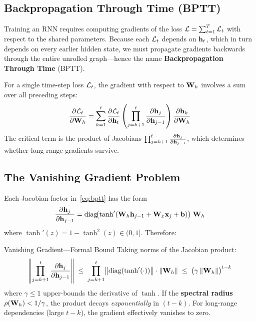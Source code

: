 \subsection{Backpropagation Through Time (BPTT)}

Training an RNN requires computing gradients of the loss
$\mathcal{L} = \sum_{t=1}^{T} \mathcal{L}_t$ with respect to the shared parameters.
Because each $\mathcal{L}_t$ depends on $\mathbf{h}_t$, which in turn depends on every
earlier hidden state, we must propagate gradients backwards through the
entire unrolled graph---hence the name
\textbf{Backpropagation Through Time} (BPTT).

For a single time-step loss $\mathcal{L}_t$, the gradient with respect to $\mathbf{W}_h$
involves a sum over all preceding steps:
\begin{equation}
\frac{\partial \mathcal{L}_t}{\partial \mathbf{W}_h}
= \sum_{k=1}^{t}
  \frac{\partial \mathcal{L}_t}{\partial \mathbf{h}_t}
  \left(\prod_{j=k+1}^{t} \frac{\partial \mathbf{h}_j}{\partial \mathbf{h}_{j-1}}\right)
  \frac{\partial \mathbf{h}_k}{\partial \mathbf{W}_h}
\label{eq:bptt}
\end{equation}
The critical term is the product of Jacobians
$\prod_{j=k+1}^{t} \frac{\partial \mathbf{h}_j}{\partial \mathbf{h}_{j-1}}$,
which determines whether long-range gradients survive.

\subsection{The Vanishing Gradient Problem}
\label{sec:vanishing}

Each Jacobian factor in~\eqref{eq:bptt} has the form
\begin{equation}
\frac{\partial \mathbf{h}_j}{\partial \mathbf{h}_{j-1}}
= \operatorname{diag}\!\bigl(\tanh'(\mathbf{W}_h \mathbf{h}_{j-1} + \mathbf{W}_x \mathbf{x}_j + \mathbf{b})\bigr)\;\mathbf{W}_h
\label{eq:jacobian}
\end{equation}
where $\tanh'(z) = 1 - \tanh^2(z) \in (0, 1]$.  Therefore:

\begin{mathresult}{Vanishing Gradient---Formal Bound}
Taking norms of the Jacobian product:
\begin{equation}
\left\lVert \prod_{j=k+1}^{t} \frac{\partial \mathbf{h}_j}{\partial \mathbf{h}_{j-1}} \right\rVert
\;\leq\;
\prod_{j=k+1}^{t}
  \bigl\lVert \operatorname{diag}(\tanh'(\cdot)) \bigr\rVert \cdot \lVert \mathbf{W}_h \rVert
\;\leq\;
\bigl(\gamma \,\lVert \mathbf{W}_h \rVert\bigr)^{t-k}
\label{eq:vanishing_bound}
\end{equation}
where $\gamma \leq 1$ upper-bounds the derivative of $\tanh$.
If the \textbf{spectral radius} $\rho(\mathbf{W}_h) < 1/\gamma$, the product
decays \emph{exponentially} in $(t - k)$.  For long-range dependencies
(large $t - k$), the gradient effectively vanishes to zero.
\end{mathresult}

